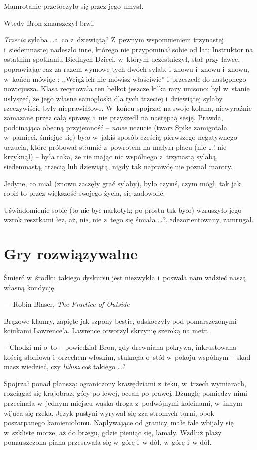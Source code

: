 \documentclass[oneside,polish,11pt,rmheadings]{mwbk}
\begin{document}
Mamrotanie przetoczyło się przez jego umysł. 

Wtedy Bron zmarszczył brwi. 

\textit{Trzecia }sylaba  \ldots  a~co z~dziewiątą? Z~pewnym wspomnieniem trzynastej i~siedemnastej nadeszło inne, którego nie przypominał sobie od lat: Instruktor na ostatnim spotkaniu Biednych Dzieci, w~którym uczestniczył, stał przy ławce, poprawiając raz za razem wymowę tych dwóch sylab. i~znowu i~znowu i~znowu, w~końcu mówiąc : ,,Wciąż ich nie mówisz właściwie'' i~przeszedł do następnego nowicjusza. Klasa recytowała ten bełkot jeszcze kilka razy unisono: był w~stanie usłyszeć, że jego własne samogłoski dla tych trzeciej i~dziewiątej sylaby rzeczywiście były nieprawidłowe. W~końcu spojrzał na swoje kolana, niewyraźnie zamazane przez całą sprawę; i~nie przyszedł na następną sesję. Prawda, podcinająca obecną przyjemność -- \textit{nowe } uczucie (twarz Spike zamigotała w~pamięci, śmiejąc się) było w~jakiś sposób częścią pierwszego negatywnego uczucia, które próbował stłumić z~powrotem na małym placu (nie  \ldots ! nie krzyknął) -- była taka, że nie mając nic wspólnego z~trzynastą sylabą, siedemnastą, trzecią lub dziewiątą, nigdy tak naprawdę nie poznał mantry. 

Jedyne, co miał (znowu zaczęły grać sylaby), było czymś, czym mógł, tak jak robił to przez większość swojego życia, się zadowolić. 

Uświadomienie sobie (to nie był narkotyk; po prostu tak było) wzruszyło jego wzrok resztkami łez, aż, nie, nie z~tego się śmiała \ldots ?, zdezorientowany, zamrugał.  

\chapter{Gry rozwiązywalne }

Śmierć w~środku takiego dyskursu jest niezwykła i~pozwala nam widzieć naszą własną kondycję. 

\smallskip
\noindent --- Robin Blaser, \textit{The Practice of Outside}
\bigskip

Brązowe klamry, zapięte jak szpony bestie, odskoczyły pod pomarszczonymi kciukami Lawrence'a. Lawrence otworzył skrzynię szeroką na metr. 

-- Chodzi mi o~to -- powiedział Bron, gdy drewniana pokrywa, inkrustowana kością słoniową i~orzechem włoskim, stuknęła o~stół w~pokoju wspólnym -- skąd masz wiedzieć, czy \textit{lubisz }coś takiego \ldots ? 

Spojrzał ponad planszą: ograniczony krawędziami z~teku, w~trzech wymiarach, rozciągał się krajobraz, góry po lewej, ocean po prawej.  Dżunglę pomiędzy nimi przecinała w~jednym miejscu wąska droga z~podwójnymi koleinami, w~innym wijąca się rzeka.  Język pustyni wyrywał się zza stromych turni, obok poszarpanego kamieniołomu. Napływające od granicy, małe fale wbijały się w~szkliste morze, aż do brzegu, gdzie pieniąc się, łamały. Wzdłuż plaży pomarszczona piana przesuwała się w~górę i~w dół, w~górę i~w dół.  
\end{document}
